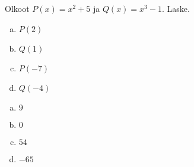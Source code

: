 \begin{tehtava}
    Olkoot $P(x)=x^2+5$ ja $Q(x)=x^3-1$. Laske.
    \begin{enumerate}[a)]
        \item $P(2)$
        \item $Q(1)$
        \item $P(-7)$
        \item $Q(-4)$
    \end{enumerate}
    \begin{vastaus}
        \begin{enumerate}[a)]
            \item $9$ %
            \item $0$ %
            \item $54$ %
            \item $-65$ %
        \end{enumerate}
    \end{vastaus}
\end{tehtava}


